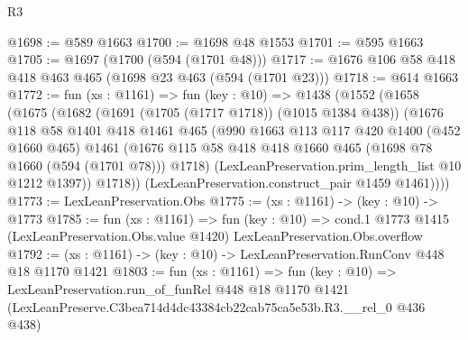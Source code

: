 \begin{lexlean}{R3}
\begin{coremodule}
@1698 := @589 @1663
@1700 := @1698 @48 @1553
@1701 := @595 @1663
@1705 := @1697 (@1700 (@594 (@1701 @48)))
@1717 := @1676 @106 @58 @418 @418 @463 @465 (@1698 @23 @463 (@594 (@1701 @23)))
@1718 := @614 @1663
@1772 := fun (xs : @1161) =>
  fun (key : @10) =>
  @1438
    (@1552
      (@1658
        (@1675
          (@1682
            (@1691 (@1705 (@1717 @1718)) (@1015 @1384 @438))
            (@1676
              @118
              @58
              @1401
              @418
              @1461
              @465
              (@990
                @1663
                @113
                @117
                @420
                @1400
                (@452 @1660 @465)
                @1461
                (@1676 @115 @58 @418 @418 @1660 @465 (@1698 @78 @1660 (@594 (@1701 @78))) @1718)
                (LexLeanPreservation.prim_length_list @10 @1212 @1397))
              @1718))
          (LexLeanPreservation.construct_pair @1459 @1461))))
@1773 := LexLeanPreservation.Obs
@1775 := (xs : @1161) -> (key : @10) -> @1773
@1785 := fun (xs : @1161) =>
  fun (key : @10) =>
  cond.{1} @1773 @1415 (LexLeanPreservation.Obs.value @1420) LexLeanPreservation.Obs.overflow
@1792 := (xs : @1161) -> (key : @10) -> LexLeanPreservation.RunConv @448 @18 @1170 @1421
@1803 := fun (xs : @1161) =>
  fun (key : @10) =>
  LexLeanPreservation.run_of_funRel
    @448
    @18
    @1170
    @1421
    (LexLeanPreserve.C3bea714d4dc43384cb22cab75ca5e53b.R3.__rel_0 @436 @438)
\end{coremodule}
\end{lexlean}
